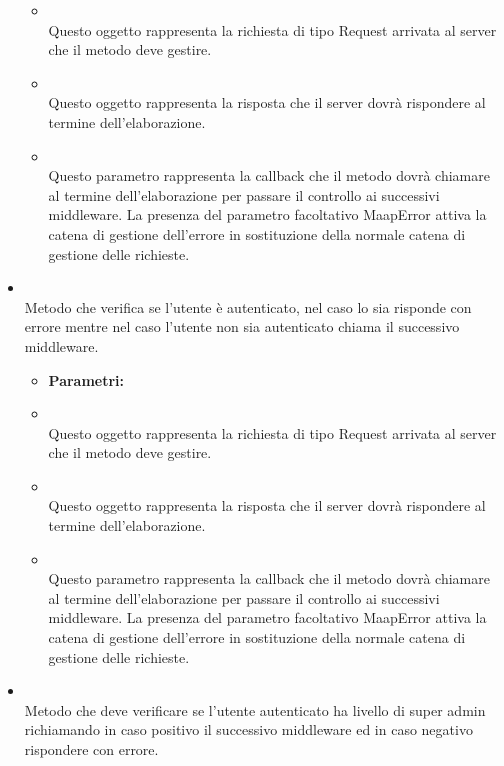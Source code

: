 \begin{itemize}
\begin{itemize}
\item[]  \\ Questo oggetto rappresenta la richiesta di tipo Request arrivata al server che il metodo deve gestire.
\item[]  \\ Questo oggetto rappresenta la risposta che il server dovrà rispondere al termine dell'elaborazione.
\item[]  \\ Questo parametro rappresenta la callback che il metodo dovrà chiamare al termine dell'elaborazione per passare il controllo ai successivi middleware. La presenza del parametro facoltativo MaapError attiva la catena di gestione dell'errore in sostituzione della normale catena di gestione delle richieste.
\end{itemize}
\item[] \textbf{} \\ Metodo che verifica se l'utente è autenticato, nel caso lo sia risponde con errore mentre nel caso l'utente non sia autenticato chiama il successivo middleware.
\begin{itemize}\addtolength{\itemsep}{-0.5\baselineskip}
\item[] \textbf{Parametri:}
\item[]  \\ Questo oggetto rappresenta la richiesta di tipo Request arrivata al server che il metodo deve gestire.
\item[]  \\ Questo oggetto rappresenta la risposta che il server dovrà rispondere al termine dell'elaborazione.
\item[]  \\ Questo parametro rappresenta la callback che il metodo dovrà chiamare al termine dell'elaborazione per passare il controllo ai successivi middleware. La presenza del parametro facoltativo MaapError attiva la catena di gestione dell'errore in sostituzione della normale catena di gestione delle richieste.
\end{itemize}
\item[] \textbf{} \\ Metodo che deve verificare se l'utente autenticato ha livello di super admin richiamando in caso positivo il successivo middleware ed in caso negativo rispondere con errore.
\begin{itemize}\addtolength{\itemsep}{-0.5\baselineskip}

\end{itemize}
\end{itemize}
